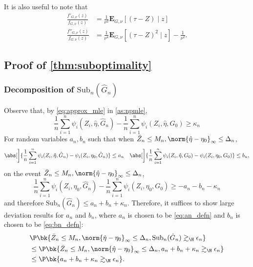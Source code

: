 \documentclass[12pt, reqno]{amsart}
\newcommand{\hateta}{\hat\eta}
\newcommand{\sub}{\mathrm{Sub}}
\newcommand{\PE}{\mathbf{E}}
\newcommand{\Dinfty}{\norm{\hateta - \eta_0}_{\infty}} %
\numberwithin{equation}{section}
\begin{document}
\begin{refsection}
\begin{appendices}
It is also useful to note that
\begin{align}
\frac{f'_{G, \nu}(z)}{f_{G,\nu}(z)} &= \frac{1}{\nu^2} \PE_{G,\nu}[(\tau - Z) \mid z]
\label{eq:firstderivative}\\
\frac{f''_{G, \nu}(z)}{ f_{G, \nu}(z)} &= \frac{1}{\nu^4} \PE_{G,\nu} [(\tau - Z)^2 \mid z]
- \frac{1}{\nu^2}.
\end{align}




\subsection{Proof of \cref{thm:suboptimality}}

\subsubsection{Decomposition of $\sub_n(\hat G_n)$}
Observe that, by \eqref{eq:approx_mle} in \cref{as:npmle}, \[
\frac{1}{n} \sum_{i=1}^n \psi_i(Z_i, \hateta, \hat G_n) - \frac1n \sum_{i=1}^n \psi_i(Z_i,
\hateta, G_0) \ge \kappa_n
\]
For random variables $a_n, b_n$ such that when $\bar Z_n \le M_n, \Dinfty \le \Delta_n$, 
\begin{align*}
\abs[\bigg]{\frac{1}{n} \sum_{i=1}^n \psi_i(Z_i, \hateta, \hat G_n) - \psi_i(Z_i,
\eta_0, \hat G_n)} \le a_n
\quad 
\abs[\bigg]{\frac{1}{n} \sum_{i=1}^n \psi_i(Z_i, \hateta, G_0) - \psi_i(Z_i,
\eta_0, G_0)} \le b_n,
\end{align*}
on the event $\bar Z_n \le M_n, \Dinfty \le \Delta_n$, \[
\frac{1}{n} \sum_{i=1}^n \psi_i(Z_i, \eta_0, \hat G_n) - \frac1n \sum_{i=1}^n \psi_i(Z_i,
\eta_0, G_0) \ge -a_n - b_n - \kappa_n
\]
and therefore $
\sub_n(\hat G_n) \le a_n + b_n + \kappa_n
$. 
Therefore, it suffices to show large deviation results for $a_n$ and $b_n$, where $a_n$
is chosen to be \eqref{eq:an_defn} and $b_n$ is chosen to be \eqref{eq:bn_defn}: \begin{align*}
&\P\bk{
  \bar Z_n \le M_n, \Dinfty \le \Delta_n, \sub_n(\hat G_n) \gtrsim_\H \epsilon_n
} \\&\le \P\bk{
  \bar Z_n \le M_n, \Dinfty \le \Delta_n, a_n+b_n+\kappa_n \gtrsim_\H \epsilon_n
} \\&\le \P\bk{a_n+b_n+\kappa_n \gtrsim_\H \epsilon_n}. 
\end{align*}



\end{appendices}
\end{refsection}
\end{document}
